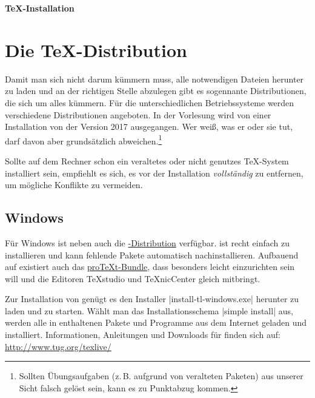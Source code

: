 \documentclass[
	vorläufig=false, 
	datum=2017-10-16,
	titel=Installationshinweise,
]{../tex/latexkurs-exercise}
\begin{document}
\begin{center}
\sffamily\bfseries\Large \TeX-Installation
\end{center}
\begin{abstract}
\noindent
Diese Anleitung erklärt ganz grundlegend, wie man eine aktuelle \TeXlive-\linebreak Distribution Installiert, die für den \LaTeX-Kurs vorausgesetzt wird.
Ein funktionierendes \TeX-System besteht im Grundsatz aus zwei Teilen: einer \TeX-Distribution und einem 
Editor.
\end{abstract}

\section{Die \TeX-Distribution}
Damit man sich nicht darum kümmern muss, alle notwendigen Dateien herunter zu laden und an der richtigen Stelle abzulegen gibt es sogennante Distributionen, die sich um alles kümmern. Für die unterschiedlichen Betriebssysteme werden verschiedene Distributionen angeboten. In der Vorlesung wird von einer Installation von \href{http://www.tug.org/texlive/}{\TeXlive} der Version 2017 ausgegangen. Wer weiß, was er oder sie tut, darf davon aber grundsätzlich abweichen.\footnote{Sollten Übungsaufgaben (z.\,B. aufgrund von veralteten Paketen) aus unserer Sicht falsch gelöst sein, kann es zu Punktabzug kommen.}

Sollte auf dem Rechner schon ein veraltetes oder nicht genutzes \TeX-System installiert sein, empfiehlt es sich, es vor der Installation \emph{vollständig} zu entfernen, um mögliche Konflikte zu vermeiden.

\subsection*{Windows}
Für Windows ist neben \href{http://www.tug.org/texlive/}{\TeXlive} auch die \href{http://www.miktex.org/}{\MikTeX-Distribution} verfügbar. \MikTeX ist recht einfach zu installieren und kann fehlende Pakete automatisch nachinstallieren. Aufbauend auf \MikTeX existiert auch das \href{http://www.tug.org/protext/}{pro\TeX t-Bundle}, dass besonders leicht einzurichten sein will und die Editoren \TeX studio und \TeX nicCenter gleich mitbringt.

Zur Installation von \TeXlive genügt es den Installer |install-tl-windows.exe| herunter zu laden und zu starten. Wählt man das Installationsschema |simple install| aus, werden alle in \TeXlive enthaltenen Pakete und Programme aus dem Internet geladen und installiert. Informationen, Anleitungen und Downloads für \TeXlive finden sich auf:\\ \url{http://www.tug.org/texlive/}
\end{document}
